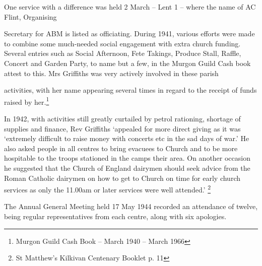 One service with a difference was held 2 March -- Lent 1 -- where the name of AC Flint, Organising

Secretary for ABM is listed as officiating. During 1941, various efforts were made to combine some much-needed social engagement with extra church funding. Several entries such as Social Afternoon, Fete Takings, Produce Stall, Raffle, Concert and Garden Party, to name but a few, in the Murgon Guild Cash book attest to this. Mrs Griffiths was very actively involved in these parish

activities, with her name appearing several times in regard to the receipt of funds raised by her.\footnote{Murgon Guild Cash Book -- March 1940 -- March 1966}

In 1942, with activities still greatly curtailed by petrol rationing, shortage of supplies and finance, Rev Griffiths `appealed for more direct giving as it was `extremely difficult to raise money with concerts etc in the sad days of war.' He also asked people in all centres to bring evacuees to Church and to be more hospitable to the troops stationed in the camps their area. On another occasion he suggested that the Church of England dairymen should seek advice from the Roman Catholic dairymen on how to get to Church on time for early church services as only the 11.00am or later services were well attended.' \footnote{St Matthew's Kilkivan Centenary Booklet p. 11}

The Annual General Meeting held 17 May 1944 recorded an attendance of twelve, being regular representatives from each centre, along with six apologies.

